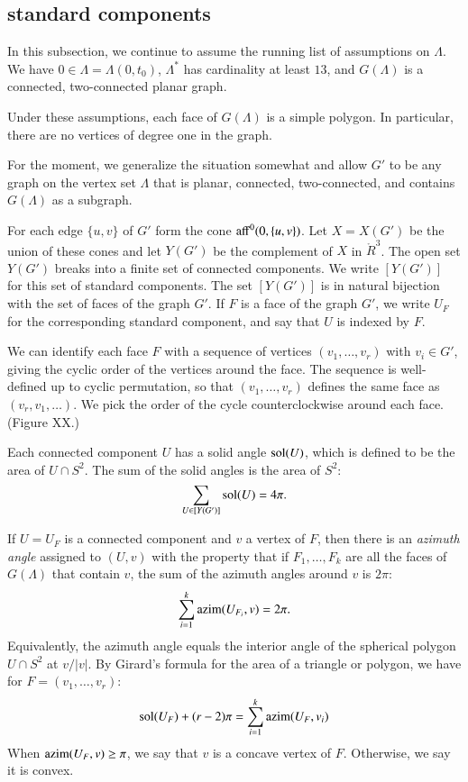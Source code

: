 \subsection{standard components}

In this subsection, we continue to assume 
the running list of assumptions on $\Lambda$.  We have
$0\in\Lambda = \Lambda(0,t_0)$, $\Lambda^*$ has cardinality
at least $13$, and $G(\Lambda)$ is a connected,
two-connected planar graph.

Under these assumptions, each face of $G(\Lambda)$ is a simple
polygon.  In particular, there are no vertices of degree one 
in the graph.

For the moment, we generalize the situation somewhat and
allow $G'$ to be any graph on the vertex set $\Lambda$ that
is planar, connected,  two-connected, and contains $G(\Lambda)$
as a subgraph.

For each edge $\{u,v\}$ of $G'$ form the cone
${\operatorname{aff}}^0(0,\{u,v\})$.  Let $X=X(G')$ be the union of these
cones and let $Y(G')$ be the complement of $X$ in $\ring{R}^3$.
The open set $Y(G')$ breaks into a finite set of connected
components. 
We write $[Y(G')]$ for this set of standard
components.  The set $[Y(G')]$ is in natural bijection with
the set of faces of the graph $G'$.  If $F$ is a face
of the graph $G'$, we write $U_F$ for the corresponding
standard component, and say that $U$ is indexed by $F$.

We can identify each face $F$ with a sequence of vertices
$(v_1,\ldots,v_r)$ with $v_i\in G'$, giving the cyclic
order of the vertices around the face.  The sequence is well-
defined up to cyclic permutation, so that $(v_1,\ldots,v_r)$
defines the same face as $(v_r,v_1,\ldots)$.  We pick the
order of the cycle counterclockwise around each face.  
 (Figure XX.)

Each connected component $U$ has a solid angle $\operatorname{sol}(U)$, which
is defined to be the area of $U\cap S^2$.  The sum of the
solid angles is the area of $S^2$:
 $$
 \sum_{U\in[Y(G')]} \operatorname{sol}(U) = 4\pi.
 $$

If $U=U_F$ is a connected component and $v$ a vertex of $F$, then there
is an {\it azimuth angle} assigned to $(U,v)$ with the property
that if $F_1,\ldots,F_k$ are all the faces of $G(\Lambda)$
that contain $v$, the sum of the azimuth angles around
$v$ is $2\pi$:
  $$
  \sum_{i=1}^k {\operatorname{azim}}(U_{F_i},v) = 2\pi.
  $$
Equivalently, 
the azimuth angle equals the interior angle of the spherical
polygon $U\cap S^2$ at $v/|v|$.  By Girard's formula for
the area of a triangle or polygon, we have for
$F = (v_1,\ldots,v_r)$:
  $$
  \operatorname{sol}(U_F) + (r-2)\pi = \sum_{i=1}^k {\operatorname{azim}}(U_F,v_i)
  $$
When ${\operatorname{azim}}(U_F,v) \ge \pi$, we say that $v$ is a concave
vertex of $F$.  Otherwise, we say it is convex.

